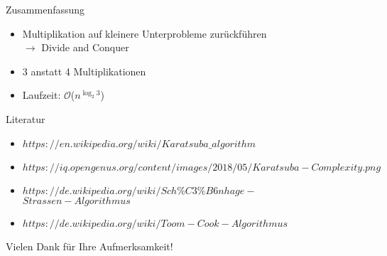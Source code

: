 \documentclass{beamer}
\begin{document}
\begin{frame}{Zusammenfassung}
    \begin{itemize}
        \item Multiplikation auf kleinere Unterprobleme zurückführen\\ $\rightarrow$ Divide and Conquer
        \item 3 anstatt 4 Multiplikationen
        \item Laufzeit: $\mathcal{O}$($n^{\log_{2}{3}}$)
    \end{itemize}
\end{frame}

\begin{frame}{Literatur}
\begin{itemize}
    \item $https://en.wikipedia.org/wiki/Karatsuba\_algorithm$
    \item $https://iq.opengenus.org/content/images/2018/05/Karatsuba-Complexity.png$
    \item $https://de.wikipedia.org/wiki/Sch\%C3\%B6nhage-$\\$Strassen-Algorithmus$
\item $https://de.wikipedia.org/wiki/Toom-Cook-Algorithmus$
\end{itemize}
    
\end{frame}

\begin{frame}
\huge{\centerline{Vielen Dank für Ihre Aufmerksamkeit!}}
\end{frame}
\end{document}
